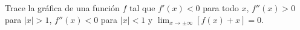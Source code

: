 \item Trace la gráfica de una función $f$ tal que $f'(x) < 0$ para todo $x$, $f''(x) > 0$ para $|x| > 1$, $f''(x) < 0$ para $|x| < 1$ y $\lim_{x \to \pm\infty} [f(x) + x] = 0$.
